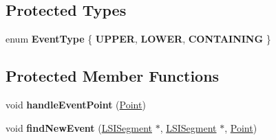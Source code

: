 \subsection*{Protected Types}
\begin{DoxyCompactItemize}
\item 
\mbox{\label{classLineSegmentIntersector_a6a52c49fcc65bed18dbae1c5da533ded}} 
enum {\bfseries Event\+Type} \{ {\bfseries U\+P\+P\+ER}, 
{\bfseries L\+O\+W\+ER}, 
{\bfseries C\+O\+N\+T\+A\+I\+N\+I\+NG}
 \}
\end{DoxyCompactItemize}
\subsection*{Protected Member Functions}
\begin{DoxyCompactItemize}
\item 
\mbox{\label{classLineSegmentIntersector_a04879d41e0615b59ade2ac62f205a9a0}} 
void {\bfseries handle\+Event\+Point} (\hyperlink{classPoint}{Point})
\item 
\mbox{\label{classLineSegmentIntersector_a0936f7337dbe849cf74ef39293b14860}} 
void {\bfseries find\+New\+Event} (\hyperlink{classLineSegmentIntersector_1_1LSISegment}{L\+S\+I\+Segment} $\ast$, \hyperlink{classLineSegmentIntersector_1_1LSISegment}{L\+S\+I\+Segment} $\ast$, \hyperlink{classPoint}{Point})
\end{DoxyCompactItemize}
